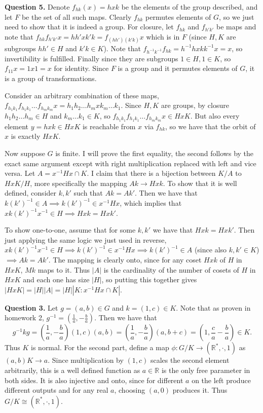 \documentclass[letterpaper, reqno,11pt]{article}
\begin{document}
{\medskip\noindent\bf Question 5.} Denote $f_{hk}(x)=hxk$ be the elements of the group described, and let $F$ be the set of all such maps. Clearly $f_{hk}$ permutes elements of $G$, so we just need to show that it is indeed a group. For closure, let $f_{hk}$ and $f_{h'k'}$ be maps and note that $f_{hk}f_{h'k'}x=hh'xk'k=f_{(hh')(k'k)}x$ which is in $F$ (since $H,K$ are subgroups $hh'\in H$ and $k'k\in K$). Note that $f_{h^{-1}k^{-1}}f_{hk}=h^{-1}hxkk^{-1}x=x$, so invertibility is fulfilled. Finally since they are subgroups $1\in H,1\in K$, so $f_{11}x=1x1=x$ for identity. Since $F$ is a group and it permutes elements of $G$, it is a group of transformations.

Consider an arbitrary combination of these maps, $f_{h_1k_1}f_{h_1k_1}\ldots f_{h_mk_m}x=h_1h_2\ldots h_mxk_m\ldots k_1$. Since $H,K$ are groups, by closure $h_1h_2\ldots h_m\in H$ and $k_m\ldots k_1\in K$, so $f_{h_1k_1}f_{h_1k_1}\ldots f_{h_mk_m}x\in HxK$. But also every element $y=hxk\in HxK$ is reachable from $x$ via $f_{hk}$, so we have that the orbit of $x$ is exactly $HxK$.

Now suppose $G$ is finite. I will prove the first equality, the second follows by the exact same argument except with right multiplication replaced with left and vice versa. Let $A=x^{-1}Hx\cap K$. I claim that there is a bijection between $K/A$ to $HxK /H$, more specifically the mapping $Ak\to Hxk$. To show that it is well defined, consider $k,k'$ such that $Ak=Ak'$. Then we have that $k(k')^{-1}\in A\implies k(k')^{-1}\in x^{-1}Hx$, which implies that $xk(k')^{-1}x^{-1}\in H\implies Hxk=Hxk'$. 

To show one-to-one, assume that for some $k,k'$ we have that $Hxk=Hxk'$. Then just applying the same logic we just used in reverse, $xk(k')^{-1}x^{-1}\in H\implies k(k')^{-1}\in x^{-1}Hx\implies k(k')^{-1}\in A$ (since also $k,k'\in K$) $\implies Ak=Ak'$. The mapping is clearly onto, since for any coset $Hxk$ of $H$ in $HxK$, $Mk$ maps to it. Thus $|A|$ is the cardinality of the number of cosets of $H$ in $HxK$ and each one has size $|H|$, so putting this together gives $|HxK|=|H||A|=|H| \left| K:x^{-1} Hx\cap K \right| $.

{\medskip\noindent\bf Question 3.} Let $g=(a,b)\in G$ and $k=(1,c)\in K$. Note that as proven in homework 2, $g^{-1}=(\frac{1}{a},-\frac{b}{a})$. Then we have that
\[
g^{-1}kg=\left( \frac{1}{a},-\frac{b}{a} \right) \left( 1,c \right) (a,b)=\left( \frac{1}{a},-\frac{b}{a} \right)\left( a,b+c \right) =(1,\frac{c}{a}-\frac{b}{a})\in K
.\]
Thus $K$ is normal. For the second part, define a map $\phi: G/K\to (\mathbb{R}^{*},\cdot,1)$ as $(a,b)K\to a$. Since multiplication by $(1,c)$ scales the second element arbitrarily, this is a well defined function as $a\in \mathbb{R}$ is the only free parameter in both sides. It is also injective and onto, since for different $a$ on the left produce different outputs and for any real $a$, choosing $(a,0)$ produces it. Thus $G /K\cong (\mathbb{R}^{*},\cdot,1)$.
\end{document}
